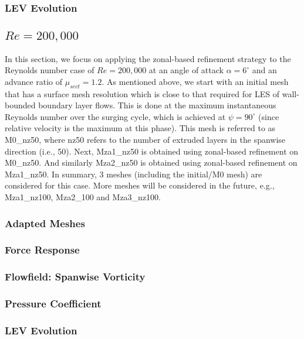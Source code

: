 \subsubsection{LEV Evolution}

\label{sec:zonal_LEV}


\subsection{ $Re=200,000$}

In this section, we focus on applying the zonal-based refinement strategy to the Reynolds number case of $Re=200,000$ at an angle of attack $\alpha=6^\circ$ and an advance ratio of $\mu_{sect}=1.2$.
As mentioned above, we start with an initial mesh that has a surface mesh resolution which is close to that required for LES of wall-bounded boundary layer flows. This is done at the maximum instantaneous Reynolds number over the surging cycle, which is achieved at $\psi=90^\circ$ (since relative velocity is the maximum at this phase). 
This mesh is referred to as M0\_nz50, where nz50 refers to the number of extruded layers in the spanwise direction (i.e., 50).
Next, Mza1\_nz50 is obtained using zonal-based refinement on M0\_nz50. And similarly Mza2\_nz50 is obtained using zonal-based refinement on Mza1\_nz50. In summary, 3 meshes (including the initial/M0 mesh) are considered for this case. More meshes will be considered in the future, e.g., Mza1\_nz100, Mza2\_100 and Mza3\_nz100.

\subsubsection{Adapted Meshes}

\label{sec:zonal_mesh_and_error_Re200k}


\subsubsection{Force Response}

\label{sec:zonal_force_response_Re200k}

\subsubsection{Flowfield: Spanwise Vorticity}

\label{sec:zonal_vorticity_Re200k}

\subsubsection{Pressure Coefficient}

\label{sec:zonal_cp_Re200k}

\subsubsection{LEV Evolution}

\label{sec:zonal_LEV_Re200k}




%

